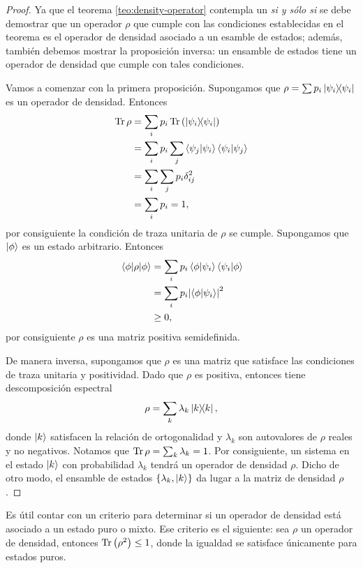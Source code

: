 \begin{proof}
	Ya que el teorema \ref{teo:density-operator} contempla un \textit{si
	y sólo si} se debe demostrar que un operador $\rho$ que cumple con 
	las condiciones establecidas en el teorema es el operador 
	de densidad asociado a un esamble de estados; además, también debemos
	mostrar la proposición inversa: un ensamble de estados
	tiene un operador de densidad que cumple con tales condiciones.
	
	Vamos a comenzar con la primera proposición. 
	Supongamos que $\rho = \sum p_i\dyad{\psii}{\psii}$ es un operador de
	densidad. Entonces 
	\begin{align*}
		\Tr \rho &= \sum _i p_i\Tr \qty(\dyad{\psii}{\psii})\\
		&= \sum _i p_i \sum _j \braket{\psi_j}{\psii}\braket{\psii}{\psi_j}\\
		&=\sum _i \sum _j p_i \delta _{ij}^2\\
		&=\sum _i p_i=1,
	\end{align*}
	por consiguiente la condición de traza unitaria de $\rho$ se cumple. 
	Supongamos que $\ket{\phi}$ es un estado arbitrario. Entonces
	\begin{align*}
		\matrixel{\phi}{\rho}{\phi} &= \sum _i p_i \braket{\phi}{\psii}
		\braket{\psii}{\phi} \\
		&=\sum _i p_i \abs{\braket{\phi}{\psii}}^2\\
		&\geq 0,
	\end{align*}
	por consiguiente $\rho$ es una matriz positiva semidefinida. 
 	
 	De manera inversa,
 	supongamos que $\rho$ es una matriz que satisface las condiciones
	de traza unitaria y positividad. Dado que $\rho$ es positiva, entonces
	tiene descomposición espectral \cite{nielsen_chuang_2011} 
	\begin{align*}
		\rho = \sum _k \lambda _k \dyad{k}{k},
	\end{align*}
	donde $\ket{k}$ satisfacen la relación de ortogonalidad y $\lambda _k$ son
	autovalores de $\rho$ reales y no negativos. Notamos que $\Tr \rho = \sum _k
	\lambda _k = 1$. Por consiguiente, un sistema en el estado $\ket{k}$ con 
	probabilidad $\lambda_k$ tendrá un operador de densidad $\rho$. Dicho 
	de otro modo, el ensamble de estados $\{ \lambda_k,\ket{k}\}$ 
	da lugar a la matriz de densidad $\rho$. 
\end{proof}

Es útil contar con un criterio para determinar si un operador de densidad 
está asociado a un estado puro o mixto. Ese criterio es el siguiente:
sea $\rho$ un operador de densidad, entonces
$\Tr \qty(\rho^2)\leq 1$, donde la igualdad se satisface únicamente
para estados puros.

